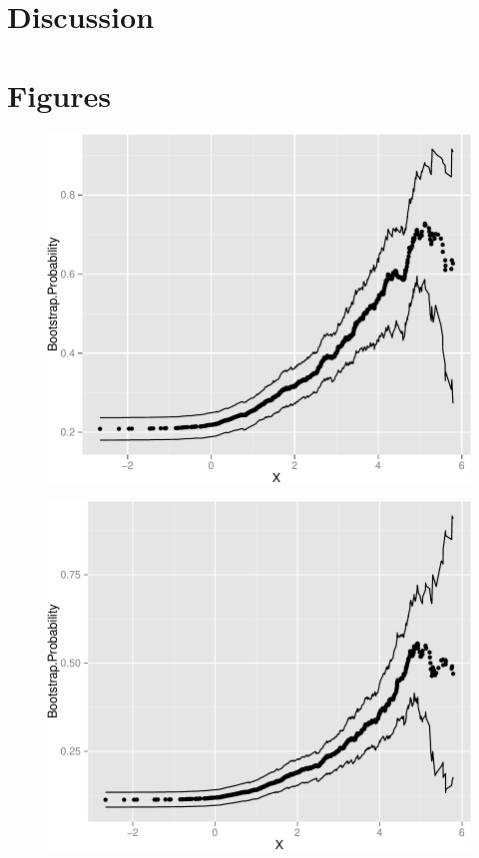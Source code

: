 \documentclass[11pt,]{article}
\begin{document}
\section{Discussion}\label{discussion}

\section{Figures}\label{figures}

\begin{figure}[htbp]
\centering
\includegraphics{manuscript_files/figure-latex/epa_child_cp_plot-1.pdf}
\caption{}
\end{figure}

\newpage

\begin{figure}[htbp]
\centering
\includegraphics{manuscript_files/figure-latex/who_drink_cp_plot-1.pdf}
\caption{}
\end{figure}
\end{document}
